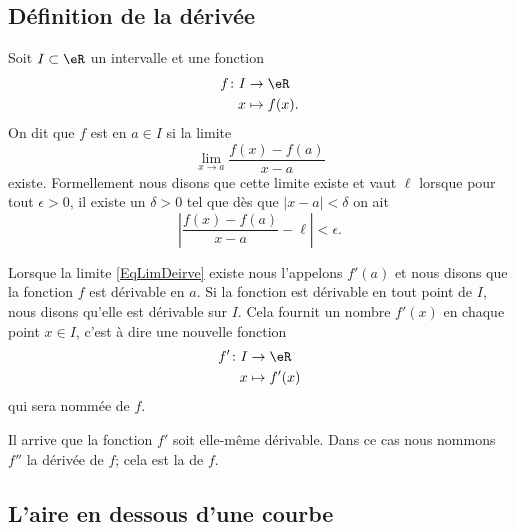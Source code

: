 \subsection{Définition de la dérivée}

Soit $I\subset\eR$ un intervalle et une fonction
\begin{equation}
	\begin{aligned}
		f\colon I&\to \eR \\
		x&\mapsto f(x). 
	\end{aligned}
\end{equation}
On dit que $f$ est  en $a\in I$ si la limite
\begin{equation}	\label{EqLimDeirve}
	\lim_{x\to a} \frac{ f(x)-f(a) }{ x-a }
\end{equation}
existe. Formellement nous disons que cette limite existe et vaut $\ell$ lorsque pour tout $\epsilon>0$, il existe un $\delta>0$ tel que dès que $| x-a |<\delta$ on ait
\begin{equation}
	\left| \frac{ f(x)-f(a) }{ x-a } -\ell \right| <\epsilon.
\end{equation}

Lorsque la limite \eqref{EqLimDeirve} existe nous l'appelons $f'(a)$ et nous disons que la fonction $f$ est dérivable en $a$. Si la fonction est dérivable en tout point de $I$, nous disons qu'elle est dérivable sur $I$. Cela fournit un nombre $f'(x)$ en chaque point $x\in I$, c'est à dire une nouvelle fonction
\begin{equation}
	\begin{aligned}
		f'\colon I&\to \eR \\
		x&\mapsto f'(x)
	\end{aligned}
\end{equation}
qui sera nommée  de $f$.

Il arrive que la fonction $f'$ soit elle-même dérivable. Dans ce cas nous nommons $f''$ la dérivée de $f$; cela est la  de $f$.

\subsection{L'aire en dessous d'une courbe}		\label{SubSecAirePrimInto}

